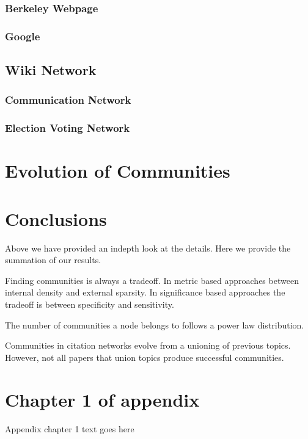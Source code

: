 \documentclass[phd,tocprelim]{cornell}
\begin{document}
\subsection{Berkeley Webpage}

\subsection{Google}


\section{Wiki Network}

\subsection{Communication Network}

\subsection{Election Voting Network}


\chapter{Evolution of Communities}


\chapter{Conclusions}

Above we have provided an indepth look at the details.  Here we provide the summation of our results.

Finding communities is always a tradeoff.  In metric based approaches between internal density and external sparsity.  In significance based approaches the tradeoff is between specificity and sensitivity.

The number of communities a node belongs to follows a power law distribution.

Communities in citation networks evolve from a unioning of previous topics.  However, not all papers that union topics produce successful communities.

\cite{fort}
\cite{porter}
\cite{kanna}
\cite{newman}
\cite{duch}
\cite{blondel}
\cite{mishra}
\cite{jain}
\cite{zhang}
\cite{andersen}
\cite{capocci}
\cite{lanc:2009}
\cite{danon}
\cite{leskovec}
\cite{hui}
\cite{maiya}
\cite{lan:2008}
\cite{hastings}
\cite{leskovec:2008}
\cite{chen}
\cite{lanc:2010}
\cite{girvan}


\appendix
\chapter{Chapter 1 of appendix}
Appendix chapter 1 text goes here


\end{document}
